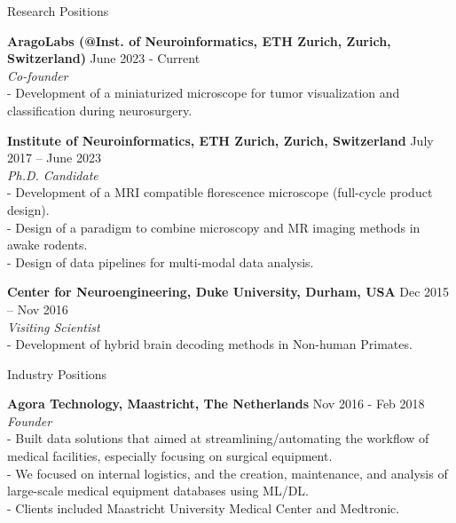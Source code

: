 \documentclass{resume}
\begin{document}
\begin{sections}{Research Positions}

{\bf AragoLabs (@Inst. of Neuroinformatics, ETH Zurich, Zurich, Switzerland)} \hfill {June 2023 - Current} 
\\{\textit{Co-founder}}
\\- Development of a miniaturized microscope for tumor visualization and classification during neurosurgery.

{\bf Institute of Neuroinformatics, ETH Zurich, Zurich, Switzerland} \hfill {July 2017 – June 2023} 
\\{\textit{Ph.D. Candidate}}
\\- Development of a MRI compatible florescence microscope (full-cycle product design).
\\- Design of a paradigm to combine microscopy and MR imaging methods in awake rodents. 
\\- Design of data pipelines for multi-modal data analysis.

{\bf Center for Neuroengineering, Duke University, Durham, USA} \hfill {Dec 2015 – Nov 2016} 
\\{\textit{Visiting Scientist}}
\\- Development of hybrid brain decoding methods in Non-human Primates.

\end{sections}

\cleardoublepage

\begin{sections}{Industry Positions}

{\bf Agora Technology, Maastricht, The Netherlands} \hfill {Nov 2016 - Feb 2018} 
\\{\textit{Founder}}
\\- Built data solutions that aimed at streamlining/automating the workflow of medical facilities, especially focusing on surgical equipment.
\\- We focused on internal logistics, and the creation, maintenance, and analysis of large-scale medical equipment databases using ML/DL.
\\- Clients included Maastricht University Medical Center and Medtronic. 

\end{sections}
\end{document}
